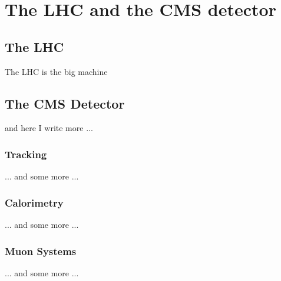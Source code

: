 \chapter{The LHC and the CMS detector}
\ifpdf
    \graphicspath{{03_Detector/plots/}}
\else
    \graphicspath{{03_Detector/plots/EPS/}{03_Detector/plots/}}
\fi

\section{The LHC}
The LHC is the big machine

\section{The CMS Detector}
and here I write more ...

\subsection{Tracking}
... and some more ...

\subsection{Calorimetry}
... and some more ...

\subsection{Muon Systems}
... and some more ...


